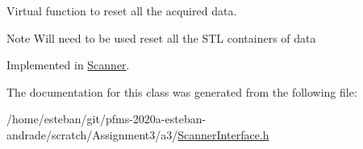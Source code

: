 Virtual function to reset all the acquired data. 

\begin{DoxyNote}{Note}
Will need to be used reset all the S\+TL containers of data 
\end{DoxyNote}


Implemented in \hyperlink{classScanner_a95dea82a0db3f7ca8cf5152c85f89239}{Scanner}.



The documentation for this class was generated from the following file\+:\begin{DoxyCompactItemize}
\item 
/home/esteban/git/pfms-\/2020a-\/esteban-\/andrade/scratch/\+Assignment3/a3/\hyperlink{ScannerInterface_8h}{Scanner\+Interface.\+h}\end{DoxyCompactItemize}

